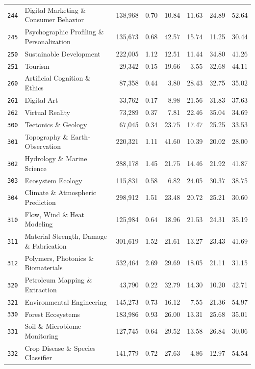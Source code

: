 \begin{longtable}{@{}l l r r r r r r@{}}
\texttt{244} & Digital Marketing \& Consumer Behavior & 138,968 & 0.70 & 10.84 & 11.63 & 24.89 & 52.64 \\
\texttt{245} & Psychographic Profiling \& Personalization & 135,673 & 0.68 & 42.57 & 15.74 & 11.25 & 30.44 \\
\texttt{250} & Sustainable Development & 222,005 & 1.12 & 12.51 & 11.44 & 34.80 & 41.26 \\
\texttt{251} & Tourism & 29,342 & 0.15 & 19.66 & 3.55 & 32.68 & 44.11 \\
\texttt{260} & Artificial Cognition \& Ethics & 87,358 & 0.44 & 3.80 & 28.43 & 32.75 & 35.02 \\
\texttt{261} & Digital Art & 33,762 & 0.17 & 8.98 & 21.56 & 31.83 & 37.63 \\
\texttt{262} & Virtual Reality & 73,289 & 0.37 & 7.81 & 22.46 & 35.04 & 34.69 \\
\texttt{300} & Tectonics \& Geology & 67,045 & 0.34 & 23.75 & 17.47 & 25.25 & 33.53 \\
\texttt{301} & Topography \& Earth-Observation & 220,321 & 1.11 & 41.60 & 10.39 & 20.02 & 28.00 \\
\texttt{302} & Hydrology \& Marine Science & 288,178 & 1.45 & 21.75 & 14.46 & 21.92 & 41.87 \\
\texttt{303} & Ecosystem Ecology & 115,831 & 0.58 & 6.82 & 24.05 & 30.37 & 38.75 \\
\texttt{304} & Climate \& Atmospheric Prediction & 298,912 & 1.51 & 23.48 & 20.72 & 25.21 & 30.60 \\
\texttt{310} & Flow, Wind \& Heat Modeling & 125,984 & 0.64 & 18.96 & 21.53 & 24.31 & 35.19 \\
\texttt{311} & Material Strength, Damage \& Fabrication & 301,619 & 1.52 & 21.61 & 13.27 & 23.43 & 41.69 \\
\texttt{312} & Polymers, Photonics \& Biomaterials & 532,464 & 2.69 & 29.69 & 18.05 & 21.11 & 31.15 \\
\texttt{320} & Petroleum Mapping \& Extraction & 43,790 & 0.22 & 32.79 & 14.30 & 10.20 & 42.71 \\
\texttt{321} & Environmental Engineering & 145,273 & 0.73 & 16.12 & 7.55 & 21.36 & 54.97 \\
\texttt{330} & Forest Ecosystems & 183,986 & 0.93 & 26.00 & 13.31 & 25.68 & 35.01 \\
\texttt{331} & Soil \& Microbiome Monitoring & 127,745 & 0.64 & 29.52 & 13.58 & 26.84 & 30.06 \\
\texttt{332} & Crop Disease \& Species Classifier & 141,779 & 0.72 & 27.63 & 4.86 & 12.97 & 54.54 \\

\end{longtable}
